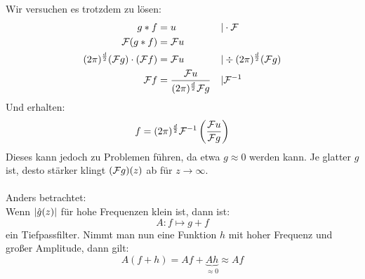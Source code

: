                 Wir versuchen es trotzdem zu lösen:
                \begin{align*}
                    g*f&=u & &|\cdot \mathcal F\\
                    \mathcal F(g * f)&= \mathcal F u \\
                    (2 \pi)^\frac{d}{2}(\mathcal F g)\cdot (\mathcal F f)&= \mathcal F u & &| \div (2 \pi)^\frac{d}{2}(\mathcal F g)\\
                    \mathcal F f &= \frac{\mathcal F u}{(2 \pi)^\frac{d}{2} \mathcal F g} & &| \mathcal F^{-1}
                \end{align*}
                Und erhalten:
                \begin{equation}
                    f= (2 \pi)^\frac{d}{2} \mathcal F^{-1}\left(\frac{\mathcal F u}{\mathcal F g}\right)
                \end{equation}
                Dieses kann jedoch zu Problemen führen, da etwa $g \approx 0$ werden kann.
                Je glatter $g$ ist, desto stärker klingt $(\mathcal F g)(z)$ ab für $z \to \infty$.\\
                \ \\
                Anders betrachtet:\\
                Wenn $\left| \hat g(z) \right|$ für hohe Frequenzen klein ist, dann ist:
                \[A:f \mapsto g +f\]
                ein Tiefpassfilter. Nimmt man nun eine Funktion $h$ mit hoher Frequenz und großer Amplitude, dann gilt:
                \[A(f + h) = Af + \underbrace{Ah}_{\approx 0} \approx Af\]

